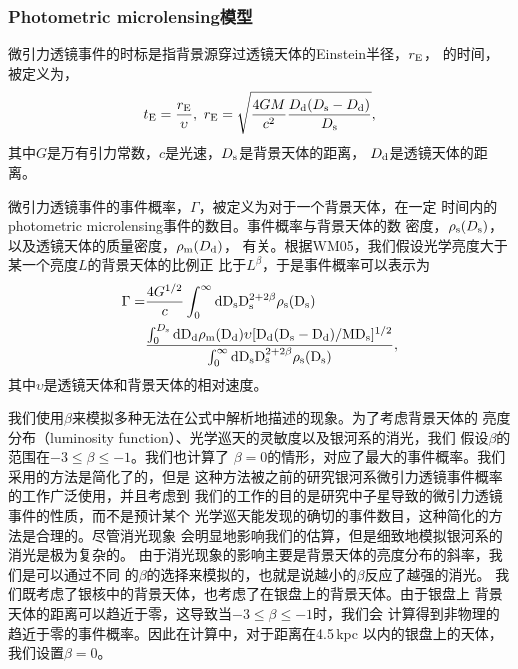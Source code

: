 \subsubsection{Photometric microlensing模型}

微引力透镜事件的时标是指背景源穿过透镜天体的Einstein半径，$r_{\rm{E}}$，
的时间，被定义为\supercite{Paczynski1996}，
%
\begin{equation}
\label{te}
t_{\rm{E}}=\frac{r_{\rm{E}}}{\upsilon},\
r_{\rm{E}}=\sqrt{\frac{4GM}{c^{2}}\frac{D_{\rm{d}}(D_{\rm{s}}-D_{\rm{d}})}{D_{\rm{s}}}},
\end{equation}
%
其中$G$是万有引力常数，$c$是光速，$D_{\rm{s}}$是背景天体的距离，
$D_{\rm{d}}$是透镜天体的距离。

微引力透镜事件的事件概率，$\Gamma$，被定义为对于一个背景天体，在一定
时间内的photometric microlensing事件的数目。事件概率与背景天体的数
密度，$\rho_{\rm{s}}(D_{\rm{s}})$，以及透镜天体的质量密度，$\rho_{\rm{m}}(D_{\rm{d}})$，
有关。根据WM05，我们假设光学亮度大于某一个亮度$L$的背景天体的比例正
比于$L^{\beta}$，于是事件概率可以表示为
%
\begin{equation}
\label{rate}
\begin{split}
\Gamma=&\frac{4G^{1/2}}{c}\int_{0}^{\infty}\rm{d}D_{\rm{s}}D_{\rm{s}}^{2+2\beta}\rho_{\rm{s}}(D_{\rm{s}})\\
	     &\frac{\int_{0}^{D_{\rm{s}}}\rm{d}D_{\rm{d}}\rho_{\rm{m}}(D_{\rm{d}})\upsilon[D_{\rm{d}}(D_{\rm{s}}-D_{\rm{d}})/MD_{\rm{s}}]^{1/2}}{\int_{0}^{\infty}\rm{d}D_{\rm{s}}D_{\rm{s}}^{2+2\beta}\rho_{\rm{s}}(D_{\rm{s}})},
\end{split}
\end{equation}
%
其中$\upsilon$是透镜天体和背景天体的相对速度。

我们使用$\beta$来模拟多种无法在公式中解析地描述的现象。为了考虑背景天体的
亮度分布（luminosity function）、光学巡天的灵敏度以及银河系的消光，我们
假设$\beta$的范围在$-3\leq\beta\leq-1$\supercite{kiraga}。我们也计算了
$\beta=0$的情形，对应了最大的事件概率。我们采用的方法是简化了的，但是
这种方法被之前的研究银河系微引力透镜事件概率的工作广泛使用，并且考虑到
我们的工作的目的是研究中子星导致的微引力透镜事件的性质，而不是预计某个
光学巡天能发现的确切的事件数目，这种简化的方法是合理的。尽管消光现象
会明显地影响我们的估算，但是细致地模拟银河系的消光是极为复杂的\supercite{kerins}。
由于消光现象的影响主要是背景天体的亮度分布的斜率，我们是可以通过不同
的$\beta$的选择来模拟的，也就是说越小的$\beta$反应了越强的消光。
我们既考虑了银核中的背景天体，也考虑了在银盘上的背景天体。由于银盘上
背景天体的距离可以趋近于零，这导致当$-3\leq\beta\leq-1$时，我们会
计算得到非物理的趋近于零的事件概率。因此在计算中，对于距离在4.5\,kpc
以内的银盘上的天体，我们设置$\beta=0$。

